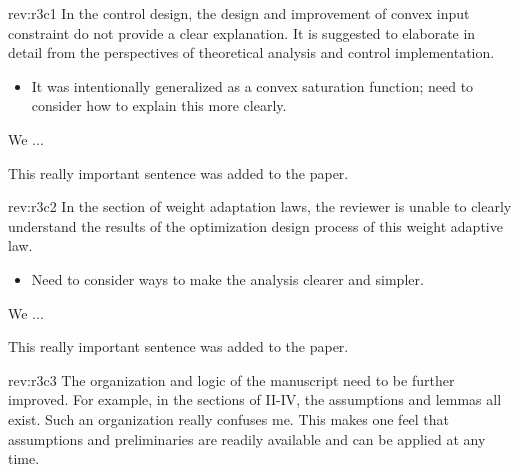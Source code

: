 \documentclass[12pt,english]{reviewresponse}
\begin{document}
\begin{revcomment}[2]{rev:r3c1}
    In the control design, the design and improvement of convex input constraint do not provide a clear explanation. It is suggested to elaborate in detail from the perspectives of theoretical analysis and control implementation.
\end{revcomment}

\begin{howtoanswer}
    \begin{itemize}
        \item It was intentionally generalized as a convex saturation function; need to consider how to explain this more clearly.
    \end{itemize}
\end{howtoanswer}

\begin{revresponse}
    We ...
    \begin{changes}
        This really important sentence was added to the paper.
    \end{changes}
\end{revresponse}

\begin{revcomment}[2]{rev:r3c2}
    In the section of weight adaptation laws, the reviewer is unable to clearly understand the results of the optimization design process of this weight adaptive law.
\end{revcomment}

\begin{howtoanswer}
    \begin{itemize}
        \item Need to consider ways to make the analysis clearer and simpler.
    \end{itemize}
\end{howtoanswer}

\begin{revresponse}
    We ...
    \begin{changes}
        This really important sentence was added to the paper.
    \end{changes}
\end{revresponse}   

\begin{revcomment}[3]{rev:r3c3}
    The organization and logic of the manuscript need to be further improved. For example, in the sections of II-IV, the assumptions and lemmas all exist. Such an organization really confuses me. This makes one feel that assumptions and preliminaries are readily available and can be applied at any time.
\end{revcomment}
\end{document}
